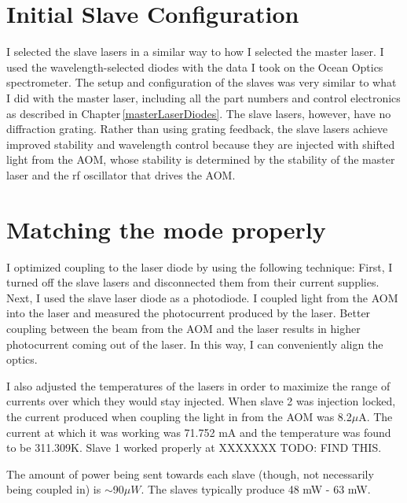 \section{Initial Slave Configuration}
\label{initialSlaveConfiguration}


I selected the slave lasers in a similar way to how I selected the master laser. I used the wavelength-selected diodes with the data I took on the Ocean Optics spectrometer. The setup and configuration of the slaves was very similar to what I did with the master laser, including all the part numbers and control electronics as described in Chapter\,\ref{masterLaserDiodes}. The slave lasers, however, have no diffraction grating. Rather than using grating feedback, the slave lasers achieve improved stability and wavelength control because they are injected with shifted light from the AOM, whose stability is determined by the stability of the master laser and the rf oscillator that drives the AOM. 




\section{Matching the mode properly}
I optimized coupling to the laser diode by using the following technique: First, I turned off the slave lasers and disconnected them from their current supplies. Next, I used the slave laser diode as a photodiode. I coupled light from the AOM into the laser and measured the photocurrent produced by the laser. Better coupling between the beam from the AOM and the laser results in higher photocurrent coming out of the laser. In this way, I can conveniently align the optics. 

I also adjusted the temperatures of the lasers in order to maximize the range of currents over which they would stay injected. 
When slave 2 was injection locked, the current produced when coupling the light in from the AOM was 8.2$\mu$A. The current at which it was working was 71.752 mA %
and the temperature was found to be 311.309K. %
Slave 1 worked properly at XXXXXXX TODO: FIND THIS.

The amount of power being sent towards each slave (though, not necessarily being coupled in) is $\sim$90$\mu W$. The slaves typically produce 48 mW - 63 mW.



